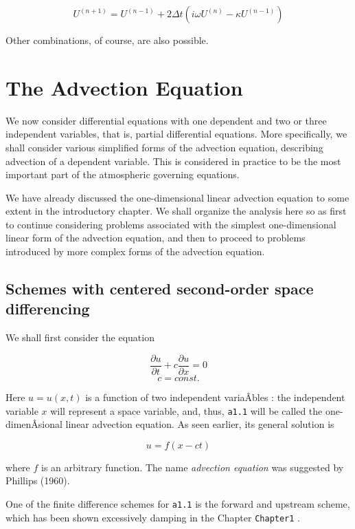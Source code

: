 \[U^{\left( n + 1 \right)} = U^{\left( n - 1 \right)} + 2\Delta t\left( i\omega U^{\left( n \right)} - \kappa U^{\left( n - 1 \right)} \right)\]

Other combinations, of course, are also possible.

\section{The Advection Equation}\label{Chapter3}

We now consider differential equations with one dependent and two or
three independent variables, that is, partial differential equations.
More specifically, we shall consider various simplified forms of the
advection equation, describing advection of a dependent variable. This
is considered in practice to be the most important part of the
atmospheric governing equations.

We have already discussed the one-dimensional linear advection equation
to some extent in the introductory chapter. We shall organize the
analysis here so as first to continue considering problems associated
with the simplest one-dimensional linear form of the advection equation,
and then to proceed to problems introduced by more complex forms of the
advection equation.

\subsection{\texorpdfstring{\textbf{Schemes with centered second-order
space
differencing}}{Schemes with centered second-order space differencing}}\label{Section3.1}

We shall first consider the equation

{\[\frac{\partial u}{\partial t}  +c\frac{\partial u}{\partial x} = 0\]\[c = const.\]}

Here \(u = u\left( x,t \right)\) is a function of two independent
variaÂ­bles : the independent variable \(x\) will represent a space
variable, and, thus, \texttt{a1.1} will be called the one-dimenÂ­sional
linear advection equation. As seen earlier, its general solution is

{\[u = f\left( x - ct \right)\]}

where \(f\) is an arbitrary function. The name \emph{advection equation}
was suggested by Phillips (1960).

One of the finite difference schemes for \texttt{a1.1} is the forward
and upstream scheme, which has been shown excessively damping in the
Chapter \texttt{Chapter1} .


